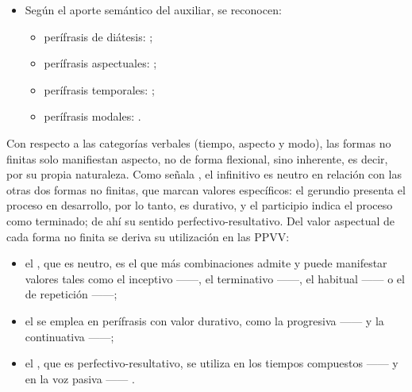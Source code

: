 \begin{itemize}
  \item Según el aporte semántico del auxiliar, se reconocen:
        \begin{itemize}
          \item perífrasis de diátesis: ;
          \item perífrasis aspectuales: ;
          \item perífrasis temporales: ;
          \item perífrasis modales: .
        \end{itemize}
\end{itemize}

\begin{recuadro}
Con respecto a las categorías verbales (tiempo, aspecto y modo), las formas no
finitas solo manifiestan aspecto, no de forma flexional, sino inherente, es
decir, por su propia naturaleza. Como señala \textcite{hernanz1999}, el
infinitivo es neutro en relación con las otras dos formas no finitas, que marcan
valores específicos: el gerundio presenta el proceso en desarrollo, por lo
tanto, es durativo, y el participio indica el proceso como terminado; de ahí su
sentido perfectivo-resultativo. Del valor aspectual de cada forma no finita se
deriva su utilización en las PPVV:

\begin{itemize}
  \item el , que es neutro, es el que más combinaciones
        admite y puede manifestar valores tales como el inceptivo
        ------, el terminativo ------, el habitual ------ o el de repetición
        ------;
  \item el  se emplea en perífrasis con valor durativo, como
        la progresiva ------ y la continuativa
        ------;
  \item el , que es perfectivo-resultativo, se utiliza en los
        tiempos compuestos ------ y en la voz pasiva
        ------ \parencite[50--51]{giammatteo2009}.
\end{itemize}
\end{recuadro}

